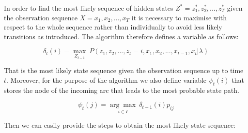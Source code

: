 In order to find the most likely sequence of hidden states $Z^*={z_1^*,z_2^*,...,z_T^*}$ given the observation sequence $X={x_1,x_2,...,x_T}$ it is necessary to maximise with respect to the whole sequence rather than individually to avoid less likely transitions as introduced. The algorithm therefore defines a variable as follows:

\begin{equation}
\delta_t(i) = \underset{Z_{t-1}}{\max}\:P(z_1,z_2,...,z_t=i,x_1,x_2,...,x_{t-1},x_{t}|\lambda)
\end{equation}

That is the most likely state sequence given the observation sequence up to time $t$. Moreover, for the purpose of the algorithm we also define variable $\psi_t(i)$ that stores the node of the incoming arc that leads to the most probable state path.

\begin{equation}
\psi_t(j) = \underset{i \in I}{\arg\max} \: \delta_{t-1}(i)p_{ij}
\end{equation}

\vspace{0.3cm}

\noindent
Then we can easily provide the steps to obtain the most likely state sequence:

